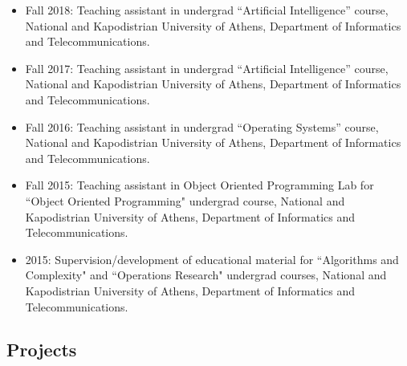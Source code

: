 \documentclass[a4paper,oneside,11pt]{article}
\begin{document}
\begin{itemize}

\item Fall 2018: Teaching assistant in undergrad ``Artificial Intelligence'' course, National and Kapodistrian University of Athens, Department of Informatics and Telecommunications.

\item Fall 2017: Teaching assistant in undergrad ``Artificial Intelligence'' course, National and Kapodistrian University of Athens, Department of Informatics and Telecommunications.

\item Fall 2016: Teaching assistant in undergrad ``Operating Systems'' course, National and Kapodistrian University of Athens, Department of Informatics and Telecommunications.

\item Fall 2015: Teaching assistant in Object Oriented Programming Lab for ``Object Oriented Programming" undergrad course, National and Kapodistrian University of Athens, Department of Informatics and Telecommunications.

\item 2015: Supervision/development of educational material for ``Algorithms and Complexity" and ``Operations Research" undergrad courses, National and Kapodistrian University of Athens, Department of Informatics and Telecommunications.

\end{itemize}

\subsection*{Projects}
\end{document}
